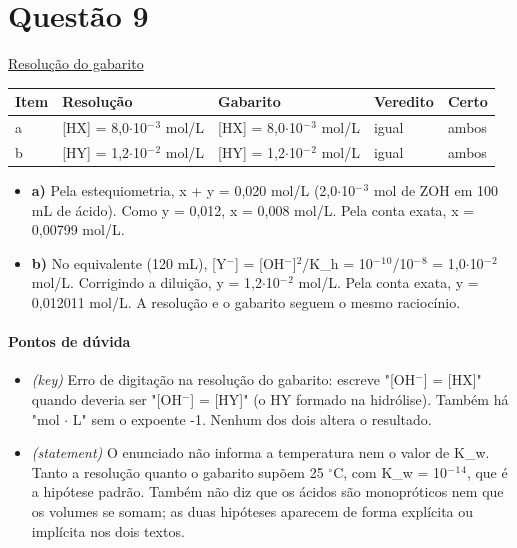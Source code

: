 \documentclass{article}%
\begin{document}
\section*{Questão 9}%
\href{https://poliedroresolve.sistemapoliedro.com.br/vestibulares/ita/2027/ita-2-fase-dia-2-21-10-2026-2-fase-dia-2/dissertativa-9-quimica-2-fase-dia-2-ita-2027}{Resolução do gabarito}\par\smallskip%
\begin{longtable}{@{}p{} p{} p{} p{} p{}@{}}\toprule Item & Resolução & Gabarito & Veredito & Certo \\ \midrule
a & {[}HX{]} = 8,0$\cdot$10$^{-}$$^3$ mol/L & {[}HX{]} = 8,0$\cdot$10$^{-}$$^3$ mol/L & igual & ambos \\
b & {[}HY{]} = 1,2$\cdot$10$^{-}$$^2$ mol/L & {[}HY{]} = 1,2$\cdot$10$^{-}$$^2$ mol/L & igual & ambos \\
\bottomrule\end{longtable}%
\begin{itemize}%
\item%
\textbf{a)} Pela estequiometria, x + y = 0,020 mol/L (2,0$\cdot$10$^{-}$$^3$ mol de ZOH em 100 mL de ácido). Como y = 0,012, x = 0,008 mol/L. Pela conta exata, x = 0,00799 mol/L.%
\item%
\textbf{b)} No equivalente (120 mL), {[}Y$^{-}${]} = {[}OH$^{-}${]}$^2$/K\_h = 10$^{-}$$^{1}$$^{0}$/10$^{-}$$^{8}$ = 1,0$\cdot$10$^{-}$$^2$ mol/L. Corrigindo a diluição, y = 1,2$\cdot$10$^{-}$$^2$ mol/L. Pela conta exata, y = 0,012011 mol/L. A resolução e o gabarito seguem o mesmo raciocínio.%
\end{itemize}%
\paragraph{Pontos de dúvida}%
\begin{itemize}%
\item%
\textit{(key)} Erro de digitação na resolução do gabarito: escreve "{[}OH$^{-}${]} = {[}HX{]}" quando deveria ser "{[}OH$^{-}${]} = {[}HY{]}" (o HY formado na hidrólise). Também há "mol $\cdot$ L" sem o expoente -1. Nenhum dos dois altera o resultado.%
\item%
\textit{(statement)} O enunciado não informa a temperatura nem o valor de K\_w. Tanto a resolução quanto o gabarito supõem 25 $^\circ$C, com K\_w = 10$^{-}$$^{1}$$^{4}$, que é a hipótese padrão. Também não diz que os ácidos são monopróticos nem que os volumes se somam; as duas hipóteses aparecem de forma explícita ou implícita nos dois textos.%
\end{itemize}%
\end{document}
